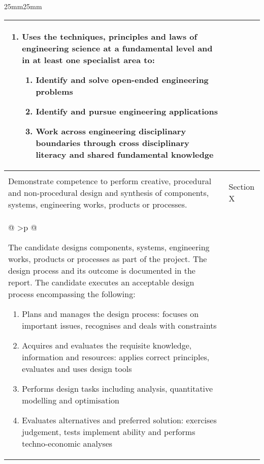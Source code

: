 {\begin{USS@SetMargins}{25mm}{25mm}
\begin{longtable}{@{\extracolsep{\fill}}| >{\raggedright}p{} | >{\raggedright\noindent\arraybackslash}p{32mm} |}
{\begin{enumerate}
					\item Uses the techniques, principles and laws of engineering science at a fundamental level and in at least one specialist area to:
					\begin{enumerate}
						\item Identify and solve open-ended engineering problems
						\item Identify and pursue engineering applications
						\item Work across engineering disciplinary boundaries through cross disciplinary literacy and shared fundamental knowledge
					\end{enumerate}
				\end{enumerate}
				\par}                                                                                                                                                                    \\
			\hline
			\multicolumn{2}{|>{\small\sffamily\bfseries\columncolor[gray]{.8}}c|}{\capitalisewords{ELO 3: Engineering Design}}                                                       \\
			\nobreakhline
			Demonstrate competence to perform creative, procedural and non-procedural design and synthesis of components, systems, engineering works, products or processes. & \textbullet \space Section X \\
			\nobreakhline
			\multicolumn{2}
			{@{\hspace{\fill}} >{\small\normalfont\justifying}p{\textwidth} @{\hspace{\fill}}}{
				\par The candidate designs components, systems, engineering works, products or processes as part of the project. The design process and its outcome is documented in the report. The candidate executes an acceptable design process encompassing the following:
				\begin{enumerate}
					\item Plans and manages the design process: focuses on important issues, recognises and deals with constraints
					\item Acquires and evaluates the requisite knowledge, information and resources: applies correct principles, evaluates and uses design tools
					\item Performs design tasks including analysis, quantitative modelling and optimisation
					\item Evaluates alternatives and preferred solution: exercises judgement, tests implement ability and performs techno-economic analyses

\end{enumerate}}
\end{longtable}
\end{USS@SetMargins}}
